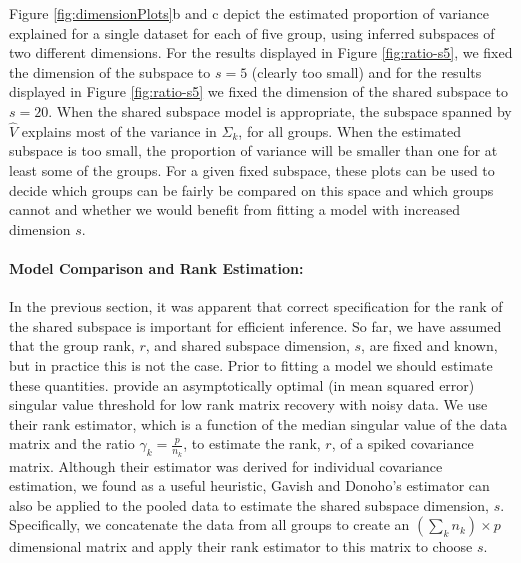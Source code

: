 \documentclass[12pt]{article}
\begin{document}
Figure \ref{fig:dimensionPlots}b and c depict the estimated proportion of
variance explained for a single dataset for each of five group, using
inferred subspaces of two different dimensions.  For the results
displayed in Figure \ref{fig:ratio-s5}, we fixed the dimension of the
subspace to $s=5$ (clearly too small) and for the results displayed in
Figure \ref{fig:ratio-s5} we fixed the dimension of the shared subspace
to $s=20$.  When the shared subspace model is appropriate, the
subspace spanned by $\hat{V}$ explains most of the variance in
$\Sigma_k$, for all groups.  When the estimated subspace is too small,
the proportion of variance will be smaller than one for at least some of the
groups.  For a given fixed subspace, these plots can be used to decide
which groups can be fairly be compared on this space and which groups
cannot and whether we would benefit from fitting a model with
increased dimension $s$.  

\paragraph{Model Comparison and Rank Estimation:}

In the previous section, it was apparent that correct specification
for the rank of the shared subspace is important for efficient
inference.  So far, we have assumed that the group rank, $r$, and
shared subspace dimension, $s$, are fixed and known, but in practice
this is not the case.  Prior to fitting a model we should estimate
these quantities.  \citet{Gavish2014} provide an asymptotically
optimal (in mean squared error) singular value threshold for low rank
matrix recovery with noisy data.  We use their rank estimator, which
is a function of the median singular value of the data matrix and the
ratio $\gamma_k =\frac{p}{n_k}$, to estimate the rank, $r$, of a
spiked covariance matrix.  Although their estimator was derived for
individual covariance estimation, we found as a useful heuristic,
Gavish and Donoho's estimator can also be applied to the pooled data
to estimate the shared subspace dimension, $s$.  Specifically, we concatenate
the data from all groups to create an $(\sum_k n_k) \times p$
dimensional matrix and apply their rank estimator to this matrix to
choose $s$.
\end{document}
